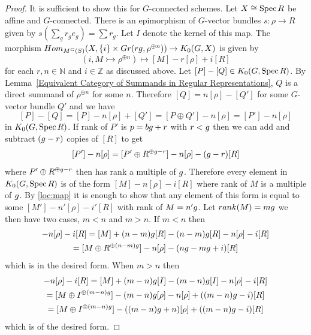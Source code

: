 \documentclass[10pt,a4paper]{amsart}
\newcommand{\ZZ}{\mathbb{Z}}
\newcommand{\mono}{\rightarrowtail}
\newcommand{\spec}{\mathrm{Spec\hskip .5mm }}
\begin{document}
	\begin{proof}
     It is sufficient to show this for $G$-connected schemes. Let $X\cong \spec R$ be affine and $G$-connected. There is an epimorphism of $G$-vector bundles $s:\rho \to R$ given by $s(\sum_g r_ge_g)=\sum r_g$. Let $I$ denote the kernel of this map. The morphism $Hom_{M^G(S)}(X,\{i\}\times Gr(r\textsl{g},\rho^{\oplus n}))\to K_0(G,X)$ is given by
		\begin{equation}\label{loc:map}
		(i,M\mono \rho^{\oplus n})\mapsto [M]-r[\rho]+i[R] 
		\end{equation}  
		 for each $r,n\in\mathbb{N}$ and $i\in\ZZ$ as discussed above. Let $[P]-[Q]\in K_0(G,\spec R)$. By Lemma~\ref{Equivalent Category of Summands in Regular Representations}, $Q$ is a direct summand of $\rho^{\oplus n}$ for some $n$. Therefore $[Q]=n[\rho]-[Q']$ for some $G$-vector bundle $Q'$ and we have 
		 \[[P]-[Q]=[P]-n[\rho]+[Q']=[P\oplus Q']-n[\rho]=[P']-n[\rho]\]
		 in $K_0(G, \spec R)$. If rank of $P'$ is $p=b\textsl{g}+r$ with $r<\textsl{g}$ then we can add and subtract $(\textsl{g}-r)$ copies of $[R]$ to get 
		 \[ [P']-n[\rho]=[P'\oplus R^{\oplus \textsl{g}-r}]-n[\rho]-(\textsl{g}-r)[R] \]
		 where $P'\oplus R^{\oplus \textsl{g}-r}$ then has rank a multiple of $\textsl{g}$. Therefore every element in $K_0(G,\spec R)$ is of the form $[M]-n[\rho]-i[R]$ where rank of $M$ is a multiple of $\textsl{g}$. By \ref{loc:map} it is enough to show that any element of this form is equal to some $[M']-n'[\rho]-i'[R]$ with rank of $M=n'\textsl{g}$. Let $rank(M)=m\textsl{g}$ we then have two cases, $m<n$ and $m>n$. If $m<n$ then 
		 \begin{multline*}
		 [M]-n[\rho]-i[R]=[M]+(n-m)\textsl{g}[R]-(n-m)\textsl{g}[R]-n[\rho]-i[R]\\=[M\oplus R^{\oplus (n-m)\textsl{g}}]-n[\rho]-(n\textsl{g}-m\textsl{g}+i)[R]
		 \end{multline*}
		 which is in the desired form. When $m>n$ then 
		 \begin{multline*}
		 	[M]-n[\rho]-i[R]=[M]+(m-n)\textsl{g}[I]-(m-n)\textsl{g}[I]-n[\rho]-i[R]\\
		 	=[M\oplus I^{\oplus (m-n)\textsl{g}}]-(m-n)\textsl{g}[\rho]-n[\rho]+((m-n)\textsl{g}-i)[R]\\=[M\oplus I^{\oplus (m-n)\textsl{g}}]-((m-n)\textsl{g}+n)[\rho]+((m-n)\textsl{g}-i)[R]
		 \end{multline*}  
		 which is of the desired form.
	\end{proof}
\end{document}

